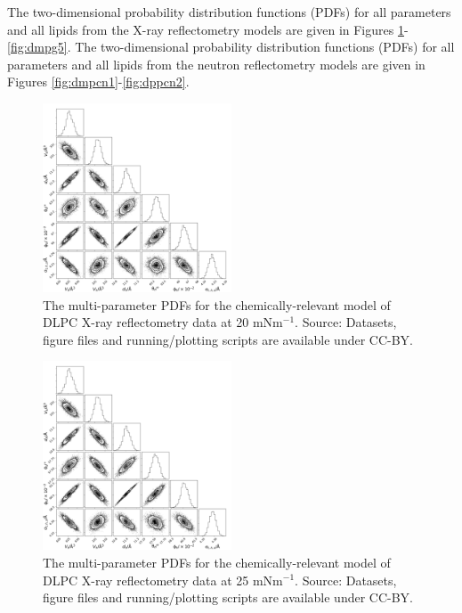 \documentclass[11pt,a4paper]{article}
\begin{document}
The two-dimensional probability distribution functions (PDFs) for all parameters and all lipids from the X-ray reflectometry models are given in Figures \ref{fig:dlpc2}-\ref{fig:dmpg5}. The two-dimensional probability distribution functions (PDFs) for all parameters and all lipids from the neutron reflectometry models are given in Figures \ref{fig:dmpcn1}-\ref{fig:dppcn2}.
\begin{figure}[h]
	\centering
	\includegraphics[width=0.50\textwidth]{figures/dlpc1_all_corner}
	\caption{The multi-parameter PDFs for the chemically-relevant model of DLPC X-ray reflectometry data at 20 mNm$^{-1}$. Source: Datasets, figure files and running/plotting scripts are available under CC-BY.\cite{mccluskey_2018}}
	\label{fig:dlpc2}
\end{figure}
\begin{figure}[h]
	\centering
	\includegraphics[width=0.50\textwidth]{figures/dlpc2_all_corner}
	\caption{The multi-parameter PDFs for the chemically-relevant model of DLPC X-ray reflectometry data at 25 mNm$^{-1}$. Source: Datasets, figure files and running/plotting scripts are available under CC-BY.\cite{mccluskey_2018}}
	\label{fig:dlpc3}
\end{figure}
\end{document}
